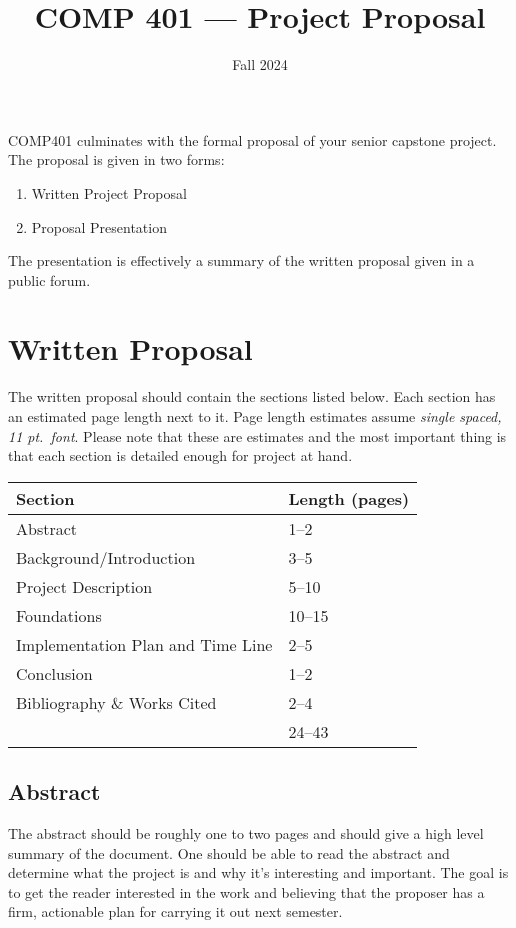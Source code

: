 \documentclass[nobib]{tufte-handout}
\title{COMP 401 --- Project Proposal}
\author{  }
\date{Fall 2024}
\begin{document}
\maketitle

COMP401 culminates with the formal proposal of your senior capstone project.  The proposal is given in two forms:
\begin{enumerate}
\item Written Project Proposal
\item Proposal Presentation
\end{enumerate}
The presentation is effectively a summary of the written proposal given in a public forum.

\section{Written Proposal}

The written proposal should contain the sections listed below.  Each section has an estimated page length next to it.  Page length estimates assume \textit{single spaced, 11 pt.\ font}.  Please note that these are estimates and the most important thing is that each section is detailed enough for project at hand.
\begin{center}
\begin{tabular}{ll}
  Section & Length (pages) \\ \toprule
  Abstract & 1--2 \\
  Background/Introduction  & 3--5 \\
  Project Description  & 5--10 \\
  Foundations & 10--15 \\
  Implementation Plan and Time Line & 2--5 \\
  Conclusion & 1--2 \\
  Bibliography \& Works Cited & 2--4 \\ \midrule
   & 24--43
\end{tabular}
\end{center}

\subsection{Abstract}

The abstract should be roughly one to two pages and should give a high level summary of the document.  One should be able to read the abstract and determine what the project is and why it's interesting and important.  The goal is to get the reader interested in the work and believing that the proposer has a firm, actionable plan for carrying it out next semester.
\end{document}
